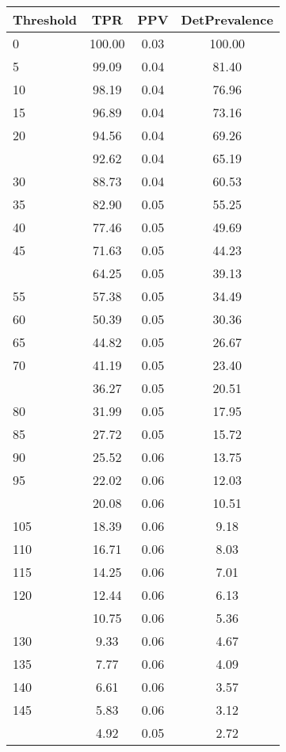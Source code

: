 \begin{table}[ht]
\centering
\begin{tabular}{lccc}
  \toprule
Threshold & TPR & PPV & DetPrevalence \\ 
  \midrule
0 & 100.00 & 0.03 & 100.00 \\ 
  5 & 99.09 & 0.04 & 81.40 \\ 
  10 & 98.19 & 0.04 & 76.96 \\ 
  15 & 96.89 & 0.04 & 73.16 \\ 
  20 & 94.56 & 0.04 & 69.26 \\ 
   \addlinespace
25 & 92.62 & 0.04 & 65.19 \\ 
  30 & 88.73 & 0.04 & 60.53 \\ 
  35 & 82.90 & 0.05 & 55.25 \\ 
  40 & 77.46 & 0.05 & 49.69 \\ 
  45 & 71.63 & 0.05 & 44.23 \\ 
   \addlinespace
50 & 64.25 & 0.05 & 39.13 \\ 
  55 & 57.38 & 0.05 & 34.49 \\ 
  60 & 50.39 & 0.05 & 30.36 \\ 
  65 & 44.82 & 0.05 & 26.67 \\ 
  70 & 41.19 & 0.05 & 23.40 \\ 
   \addlinespace
75 & 36.27 & 0.05 & 20.51 \\ 
  80 & 31.99 & 0.05 & 17.95 \\ 
  85 & 27.72 & 0.05 & 15.72 \\ 
  90 & 25.52 & 0.06 & 13.75 \\ 
  95 & 22.02 & 0.06 & 12.03 \\ 
   \addlinespace
100 & 20.08 & 0.06 & 10.51 \\ 
  105 & 18.39 & 0.06 & 9.18 \\ 
  110 & 16.71 & 0.06 & 8.03 \\ 
  115 & 14.25 & 0.06 & 7.01 \\ 
  120 & 12.44 & 0.06 & 6.13 \\ 
   \addlinespace
125 & 10.75 & 0.06 & 5.36 \\ 
  130 & 9.33 & 0.06 & 4.67 \\ 
  135 & 7.77 & 0.06 & 4.09 \\ 
  140 & 6.61 & 0.06 & 3.57 \\ 
  145 & 5.83 & 0.06 & 3.12 \\ 
   \addlinespace
150 & 4.92 & 0.05 & 2.72 \\ 

\end{tabular}
\end{table}
